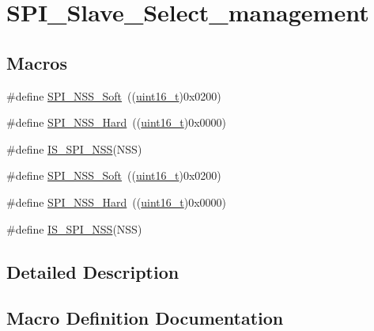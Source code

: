 \hypertarget{group___s_p_i___slave___select__management}{}\section{S\+P\+I\+\_\+\+Slave\+\_\+\+Select\+\_\+management}
\label{group___s_p_i___slave___select__management}
\subsection*{Macros}
\begin{DoxyCompactItemize}
\item 
\#define \hyperlink{group___s_p_i___slave___select__management_ga105969ee7eb635414da35b41e942e383}{S\+P\+I\+\_\+\+N\+S\+S\+\_\+\+Soft}~((\hyperlink{_p_e___types_8h_a1f1825b69244eb3ad2c7165ddc99c956}{uint16\+\_\+t})0x0200)
\item 
\#define \hyperlink{group___s_p_i___slave___select__management_ga07c547459d39fb7a6e0322147a60b74a}{S\+P\+I\+\_\+\+N\+S\+S\+\_\+\+Hard}~((\hyperlink{_p_e___types_8h_a1f1825b69244eb3ad2c7165ddc99c956}{uint16\+\_\+t})0x0000)
\item 
\#define \hyperlink{group___s_p_i___slave___select__management_gabbeedf42eccef1bae4f88c606fc3b261}{I\+S\+\_\+\+S\+P\+I\+\_\+\+N\+SS}(N\+SS)
\item 
\#define \hyperlink{group___s_p_i___slave___select__management_ga105969ee7eb635414da35b41e942e383}{S\+P\+I\+\_\+\+N\+S\+S\+\_\+\+Soft}~((\hyperlink{_p_e___types_8h_a1f1825b69244eb3ad2c7165ddc99c956}{uint16\+\_\+t})0x0200)
\item 
\#define \hyperlink{group___s_p_i___slave___select__management_ga07c547459d39fb7a6e0322147a60b74a}{S\+P\+I\+\_\+\+N\+S\+S\+\_\+\+Hard}~((\hyperlink{_p_e___types_8h_a1f1825b69244eb3ad2c7165ddc99c956}{uint16\+\_\+t})0x0000)
\item 
\#define \hyperlink{group___s_p_i___slave___select__management_gabbeedf42eccef1bae4f88c606fc3b261}{I\+S\+\_\+\+S\+P\+I\+\_\+\+N\+SS}(N\+SS)
\end{DoxyCompactItemize}


\subsection{Detailed Description}


\subsection{Macro Definition Documentation}
